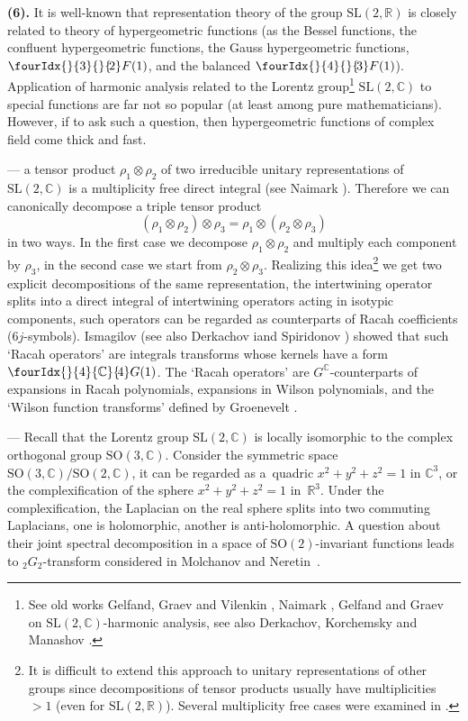 \documentclass[pdftex]{sigma}
\numberwithin{equation}{section}
\newcommand{\hyp}[2]{\fourIdx{}{#1}{}{\!#2}F}
\newcommand{\Gc}[2]{\fourIdx{}{#1}{\C}{\!#2}G}
\def\R {{\mathbb R }}
\def\C {{\mathbb C }}
\def\SL{\mathrm{SL}}
\def\SO{\mathrm{SO}}
\begin{document}
\textbf{(6).}
It is well-known that representation theory of the group
$\SL(2,\R)$ is closely related to theory of hypergeometric functions
(as the Bessel functions, the confluent hypergeometric functions,
the Gauss hypergeometric functions, $\hyp{3}{2}(1)$, and the balanced
$\hyp{4}{3}(1)$). Application of harmonic analysis
related to the Lorentz group\footnote{See old works Gelfand, Graev and
Vilenkin \cite{GGV}, Naimark \cite{Nai1,Nai2,Nai3},
Gelfand and Graev \cite{GG} on $\SL(2,\C)$-harmonic analysis,
see also Derkachov, Korchemsky and Manashov \cite{DKM,DM-plus}.} $\SL(2,\C)$ to special functions are far not so
popular (at least among pure mathematicians).
However, if to ask such a question, then hypergeometric functions
of complex field come thick and fast.

--- a tensor product $\rho_1\otimes\rho_2$ of two irreducible unitary
representations of $\SL(2,\C)$ is a multiplicity free direct integral
(see Naimark \cite{Nai1,Nai2,Nai3}).
Therefore we can canonically decompose a triple tensor product
\[
(\rho_1\otimes\rho_2)\otimes \rho_3=\rho_1\otimes(\rho_2\otimes \rho_3)
\]
in two ways.
In the first case we decompose $\rho_1\otimes\rho_2$ and multiply each
component by $\rho_3$, in the second case we start from $\rho_2\otimes \rho_3$. Realizing this idea\footnote{It is difficult to extend this approach
to unitary representations of other groups since decompositions of
tensor products usually have multiplicities $>1$ (even for $\SL(2,\R)$).
Several multiplicity free cases were examined in
\cite{Gro1,Ism1,Ism2, Ism0,Ism3}.}
we get two explicit decompositions
of the same representation, the intertwining operator splits
into a direct integral of intertwining operators acting in isotypic components,
such operators can be regarded as counterparts
of Racah coefficients ($6j$-symbols).
Ismagilov \cite{Ism1,Ism2}
(see also Derkachov iand Spiridonov \cite{DS}) showed that such
`Racah operators' are integrals transforms whose kernels have a form
$\Gc{4}{4}(1)$.
The `Racah operators'
are $G^\C$-counterparts of expansions in Racah polynomials, expansions in
Wilson polynomials, and the `Wilson function transforms' defined by
Groenevelt \cite{Gro,Gro1}.

--- Recall that the Lorentz group $\SL(2,\C)$ is locally isomorphic to
the complex orthogonal group $\SO(3,\C)$. Consider the symmetric space
$\SO(3,\C)/\SO(2,\C)$, it can be regarded as a~quadric $x^2+y^2+z^2=1$ in $\C^3$, or the complexification of
the sphere $x^2+y^2+z^2=1$ in~$\R^3$. Under the complexification,
the Laplacian on the real sphere splits into two commuting
Laplacians, one is holomorphic, another is anti-holomorphic.
A question about their joint spectral decomposition in a space
of $\SO(2)$-invariant functions leads to
${_2G_2}$-transform considered in Molchanov and Neretin~\cite{MN}.
\end{document}
